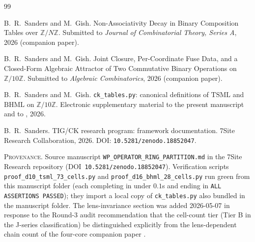 \documentclass[11pt,reqno]{amsart}
\theoremstyle{plain}
\theoremstyle{definition}
\theoremstyle{remark}
\newcommand{\Z}{\mathbb{Z}}
\newcommand{\Zten}{\Z/10\Z}
\newcommand{\TSML}{\mathrm{TSML}}
\newcommand{\BHML}{\mathrm{BHML}}
\begin{document}
\begin{thebibliography}{99}

B.~R.~Sanders and M.~Gish.
\newblock Non-Associativity Decay in Binary Composition Tables
over $\mathbb{Z}/N\mathbb{Z}$.
\newblock Submitted to \emph{Journal of Combinatorial Theory,
Series A}, 2026 (companion paper).

B.~R.~Sanders and M.~Gish.
\newblock Joint Closure, Per-Coordinate Fuse Data, and a
Closed-Form Algebraic Attractor of Two Commutative Binary
Operations on $\mathbb{Z}/10\mathbb{Z}$.
\newblock Submitted to \emph{Algebraic Combinatorics}, 2026
(companion paper).

B.~R.~Sanders and M.~Gish.
\newblock \texttt{ck\_tables.py}: canonical definitions of
$\TSML$ and $\BHML$ on $\Zten$.
\newblock Electronic supplementary material to the present
manuscript and to \cite{J01,J02}, 2026.

B.~R.~Sanders.
\newblock TIG/CK research program: framework documentation.
\newblock 7Site Research Collaboration, 2026.
\newblock DOI: \texttt{10.5281/zenodo.18852047}.

\end{thebibliography}

\vfill
\noindent
\footnotesize{%
\textsc{Provenance.}\; Source manuscript
\texttt{WP\_OPERATOR\_RING\_PARTITION.md} in the 7Site Research
repository (DOI~\texttt{10.5281/zenodo.18852047}). Verification
scripts \texttt{proof\_d10\_tsml\_73\_cells.py} and
\texttt{proof\_d16\_bhml\_28\_cells.py} run green from this
manuscript folder (each completing in under $0.1$s and ending in
\texttt{ALL ASSERTIONS PASSED}); they import a local copy of
\texttt{ck\_tables.py} also bundled in the manuscript folder. The
lens-invariance section was added 2026-05-07 in response to the
Round-3 audit recommendation that the cell-count tier (Tier B in
the J-series classification) be distinguished explicitly from the
lens-dependent chain count of the four-core companion paper
\cite{J02}.}
\end{document}
